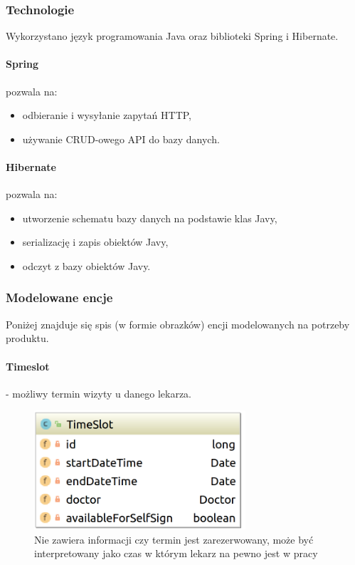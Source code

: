 \documentclass[polish,12pt]{aghthesis}
\begin{document}
\subsubsection{Technologie}
Wykorzystano język programowania Java oraz biblioteki Spring i Hibernate.
\paragraph{Spring} pozwala na:
\begin{itemize}
    \item odbieranie i wysyłanie zapytań HTTP,
    \item używanie CRUD-owego API do bazy danych.
\end{itemize}
\paragraph{Hibernate} pozwala na:
\begin{itemize}
    \item utworzenie schematu bazy danych na podstawie klas Javy,
    \item serializację i zapis obiektów Javy,
    \item odczyt z bazy obiektów Javy.
\end{itemize}
\subsubsection{Modelowane encje}
Poniżej znajduje się spis (w formie obrazków) encji modelowanych na potrzeby produktu.
    \paragraph{Timeslot} - możliwy termin wizyty u danego lekarza.
    \begin{figure}[H]
    \includegraphics[width=0.7\textwidth]{TimeSlot}
    \caption{Nie zawiera informacji czy termin jest zarezerwowany, może być interpretowany jako czas w którym lekarz na pewno jest w pracy}
    \end{figure}
\end{document}
